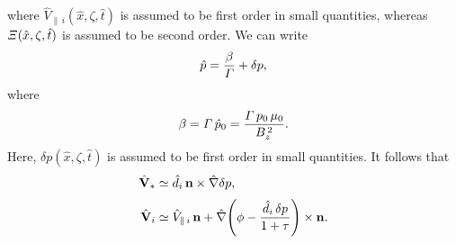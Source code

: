 \documentclass[notitlepage,12pt]{article}
\begin{document}
where $\hat{V}_{\parallel\,i}(\hat{x},\zeta,\hat{t})$ is assumed to be first order in small quantities, whereas ${\mit\Xi}(\hat{x},\zeta,\hat{t})$ is assumed to be
second order. 
We can write
\begin{equation}
\hat{p}= \frac{\beta}{{\mit\Gamma}} + \delta p,
\end{equation}
where 
\begin{equation}\label{e244}
\beta= {\mit\Gamma}\,\hat{p}_0= \frac{{\mit\Gamma}\,p_0\,\mu_0}{B_z^{\,2}}.
\end{equation}
 Here, $\delta p(\hat{x},\zeta,\hat{t})$ is assumed to be first order in small
quantities. 
It follows that
\begin{align}
\hat{\bf V}_\ast &\simeq \hat{d}_i\,{\bf n}\times \hat{\nabla} \delta p,\\[0.5ex]
\hat{\bf V}_i&\simeq  \hat{V}_{\parallel\,i} \,{\bf n}+ \hat{\nabla}\!\left(\phi - \frac{\hat{d}_i\,\delta p}{1+\tau}\right)\times {\bf n}.
\end{align}
\end{document}
